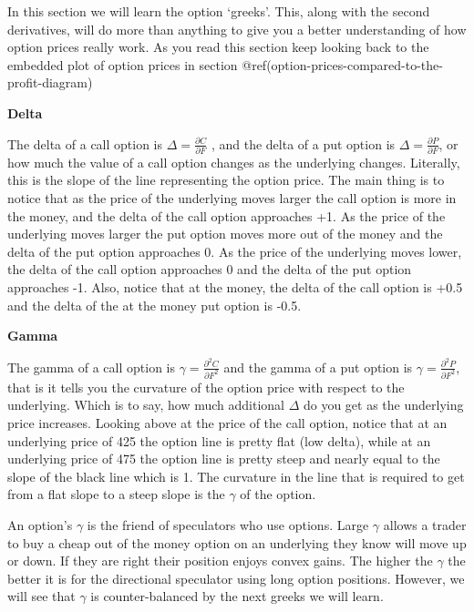 \documentclass[
  letterpaper,
  DIV=11,
  numbers=noendperiod]{scrreprt}
\begin{document}
In this section we will learn the option `greeks'. This, along with the
second derivatives, will do more than anything to give you a better
understanding of how option prices really work. As you read this section
keep looking back to the embedded plot of option prices in section
@ref(option-prices-compared-to-the-profit-diagram)

\textbf{Delta}

The delta of a call option is \(\Delta = \frac{\partial C}{\partial F}\)
, and the delta of a put option is
\(\Delta = \frac{\partial P}{\partial F}\), or how much the value of a
call option changes as the underlying changes. Literally, this is the
slope of the line representing the option price. The main thing is to
notice that as the price of the underlying moves larger the call option
is more in the money, and the delta of the call option approaches +1. As
the price of the underlying moves larger the put option moves more out
of the money and the delta of the put option approaches 0. As the price
of the underlying moves lower, the delta of the call option approaches 0
and the delta of the put option approaches -1. Also, notice that at the
money, the delta of the call option is +0.5 and the delta of the at the
money put option is -0.5.

\textbf{Gamma}

The gamma of a call option is
\(\gamma = \frac{\partial^2 C}{\partial F^2}\) and the gamma of a put
option is \(\gamma = \frac{\partial^2 P}{\partial F^2}\), that is it
tells you the curvature of the option price with respect to the
underlying. Which is to say, how much additional \(\Delta\) do you get
as the underlying price increases. Looking above at the price of the
call option, notice that at an underlying price of 425 the option line
is pretty flat (low delta), while at an underlying price of 475 the
option line is pretty steep and nearly equal to the slope of the black
line which is 1. The curvature in the line that is required to get from
a flat slope to a steep slope is the \(\gamma\) of the option.

An option's \(\gamma\) is the friend of speculators who use options.
Large \(\gamma\) allows a trader to buy a cheap out of the money option
on an underlying they know will move up or down. If they are right their
position enjoys convex gains. The higher the \(\gamma\) the better it is
for the directional speculator using long option positions. However, we
will see that \(\gamma\) is counter-balanced by the next greeks we will
learn.
\end{document}
